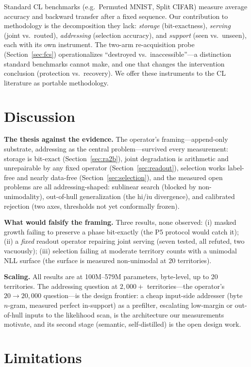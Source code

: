 \documentclass[11pt]{article}
\theoremstyle{definition}\newtheorem{definition}{Definition}
\theoremstyle{remark}\newtheorem{remark}{Remark}
\begin{document}
Standard CL benchmarks (e.g.\ Permuted MNIST, Split CIFAR) measure average accuracy and
backward transfer after a fixed sequence. Our contribution to methodology is the
decomposition they lack: \emph{storage} (bit-exactness), \emph{serving} (joint vs.\ routed),
\emph{addressing} (selection accuracy), and \emph{support} (seen vs.\ unseen), each with
its own instrument. The two-arm re-acquisition probe (Section~\ref{sec:fcs}) operationalizes
``destroyed vs.\ inaccessible''---a distinction standard benchmarks cannot make, and one
that changes the intervention conclusion (protection vs.\ recovery). We offer these
instruments to the CL literature as portable methodology.

\section{Discussion}
\label{sec:discussion}

\textbf{The thesis against the evidence.} The operator's framing---append-only substrate,
addressing as the central problem---survived every measurement: storage is bit-exact
(Section~\ref{sec:ra2b}), joint degradation is arithmetic and unrepairable by any fixed
operator (Section~\ref{sec:readout}), selection works label-free and nearly data-free
(Section~\ref{sec:selection}), and the measured open problems are all addressing-shaped:
sublinear search (blocked by non-unimodality), out-of-hull generalization (the hi/iu
divergence), and calibrated rejection (two axes, thresholds not yet conformally frozen).

\textbf{What would falsify the framing.} Three results, none observed: (i) masked
growth failing to preserve a phase bit-exactly (the P5 protocol would catch it); (ii) a
\emph{fixed} readout operator repairing joint serving (seven tested, all refuted, two
vacuously); (iii) selection failing at moderate territory counts with a unimodal NLL
surface (the surface is measured non-unimodal at 20 territories).

\textbf{Scaling.} All results are at 100M--579M parameters, byte-level, up to 20
territories. The addressing question at $2{,}000{+}$ territories---the operator's
$20 \to 20{,}000$ question---is the design frontier: a cheap input-side addresser
(byte $n$-gram, measured perfect in-support) as a prefilter, escalating low-margin or
out-of-hull inputs to the likelihood scan, is the architecture our measurements
motivate, and its second stage (semantic, self-distilled) is the open design work.

\section{Limitations}
\label{sec:limits}
\end{document}
